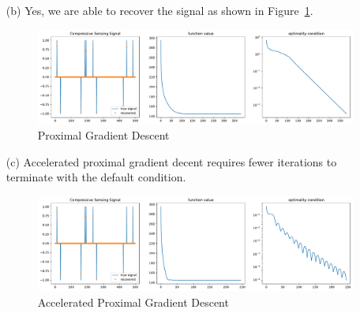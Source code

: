\documentclass[10pt]{article}
\begin{document}
\begin{solution}[Solution]
\begin{enumerate}[label=(\alph*)]
    \item[(b)] Yes, we are able to recover the signal as shown in Figure~\ref{cs_pgd}.
        \begin{figure}[ht]\centering
        \includegraphics[width=\textwidth]{img/cs_pgd.pdf}
        \caption{Proximal Gradient Descent}
        \label{cs_pgd}
    \end{figure}
    
\item[(c)] Accelerated proximal gradient decent requires fewer iterations to terminate with the default condition.
        \begin{figure}[ht]\centering
            \includegraphics[width=\textwidth]{img/cs_apgd.pdf}
            \caption{Accelerated Proximal Gradient Descent}
            \label{cs_apgd}
        \end{figure}
 

\end{enumerate}

\end{solution}
\end{document}
